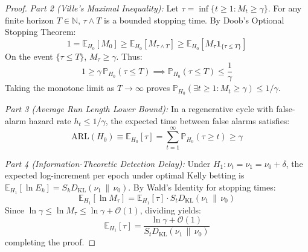\documentclass[aps,pra,twocolumn,superscriptaddress,10pt,floatfix]{revtex4-2}
\begin{document}
\begin{proof}
\textit{Part 2 (Ville's Maximal Inequality):}
Let $\tau = \inf\{t \ge 1 : M_t \ge \gamma\}$. For any finite horizon $T \in \mathbb{N}$, $\tau \wedge T$ is a bounded stopping time. By Doob's Optional Stopping Theorem:
\begin{equation}
1 = \mathbb{E}_{H_0}[M_0] \ge \mathbb{E}_{H_0}[M_{\tau \wedge T}] \ge \mathbb{E}_{H_0}[M_\tau \mathbf{1}_{\{\tau \le T\}}]
\end{equation}
On the event $\{\tau \le T\}$, $M_\tau \ge \gamma$. Thus:
\begin{equation}
1 \ge \gamma \, \mathbb{P}_{H_0}(\tau \le T) \implies \mathbb{P}_{H_0}(\tau \le T) \le \frac{1}{\gamma}
\end{equation}
Taking the monotone limit as $T \to \infty$ proves $\mathbb{P}_{H_0}(\exists t \ge 1 : M_t \ge \gamma) \le 1/\gamma$.

\textit{Part 3 (Average Run Length Lower Bound):}
In a regenerative cycle with false-alarm hazard rate $h_t \le 1/\gamma$, the expected time between false alarms satisfies:
\begin{equation}
\mathrm{ARL}(H_0) \equiv \mathbb{E}_{H_0}[\tau] = \sum_{t=1}^\infty \mathbb{P}_{H_0}(\tau \ge t) \ge \gamma
\end{equation}

\textit{Part 4 (Information-Theoretic Detection Delay):}
Under $H_1: \nu_t = \nu_1 = \nu_0 + \delta$, the expected log-increment per epoch under optimal Kelly betting is $\mathbb{E}_{H_1}[\ln E_k] = S_k D_{\mathrm{KL}}(\nu_1 \,\|\, \nu_0)$. By Wald's Identity for stopping times:
\begin{equation}
\mathbb{E}_{H_1}[\ln M_\tau] = \mathbb{E}_{H_1}[\tau] \cdot S_t D_{\mathrm{KL}}(\nu_1 \,\|\, \nu_0)
\end{equation}
Since $\ln \gamma \le \ln M_\tau \le \ln \gamma + \mathcal{O}(1)$, dividing yields:
\begin{equation}
\mathbb{E}_{H_1}[\tau] = \frac{\ln \gamma + \mathcal{O}(1)}{S_t D_{\mathrm{KL}}(\nu_1 \,\|\, \nu_0)}
\end{equation}
completing the proof.
\end{proof}
\end{document}
